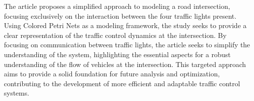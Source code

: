 The article proposes a simplified approach to modeling a road intersection, focusing exclusively on the interaction between the four traffic lights present.
Using Colored Petri Nets as a modeling framework, the study seeks to provide a clear representation of the traffic control dynamics at the intersection.
By focusing on communication between traffic lights, the article seeks to simplify the understanding of the system, highlighting the essential aspects for a robust understanding of the flow of vehicles at the intersection.
This targeted approach aims to provide a solid foundation for future analysis and optimization, contributing to the development of more efficient and adaptable traffic control systems.